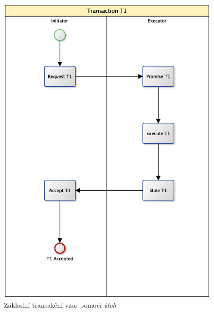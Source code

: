 \begin{figure}[htbp]
\centering
\includegraphics[width=1.0\textwidth]{obrazky/transaction-basic-tasks}
\caption{Základní transakční vzor pomocí \textit{úloh}}
\label{fig:Zk_trans_ulohy}
\end{figure}

